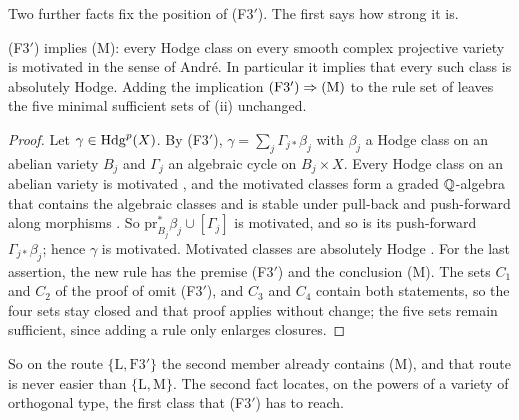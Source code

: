 Two further facts fix the position of \textup{(F3$'$)}. The first says how
strong it is.

\begin{proposition}\label{prop:f3primestrength}
\textup{(F3$'$)} implies \textup{(M)}: every Hodge class on every smooth
complex projective variety is motivated in the sense of Andr\'e. In
particular it implies that every such class is absolutely Hodge. Adding the
implication $\textup{(F3$'$)}\Rightarrow\textup{(M)}$ to the rule set of
 leaves the five minimal sufficient sets of
(ii) unchanged.
\end{proposition}

\begin{proof}
Let $\gamma\in\mathrm{Hdg}^{p}(X)$. By \textup{(F3$'$)},
$\gamma=\sum_{j}\Gamma_{j*}\beta_{j}$ with $\beta_{j}$ a Hodge class on an
abelian variety $B_{j}$ and $\Gamma_{j}$ an algebraic cycle on $B_{j}\times X$.
Every Hodge class on an abelian variety is motivated
\cite[Th\'eor\`eme~0.6.2]{And96b}, and the motivated classes form a graded
$\mathbb{Q}$-algebra that contains the algebraic classes and is stable under
pull-back and push-forward along morphisms \cite[\S2]{And96b}. So
$\mathrm{pr}_{B_{j}}^{*}\beta_{j}\cup[\Gamma_{j}]$ is motivated, and so is its
push-forward $\Gamma_{j*}\beta_{j}$; hence $\gamma$ is motivated. Motivated
classes are absolutely Hodge \cite[\S2]{And96b}. For the last assertion,
the new rule has the premise (F3$'$) and the conclusion (M). The sets $C_{1}$
and $C_{2}$ of the proof of  omit (F3$'$), and $C_{3}$ and
$C_{4}$ contain both statements, so the four sets stay closed and that proof
applies without change; the five sets remain sufficient, since adding a rule
only enlarges closures.
\end{proof}

So on the route $\{\mathrm{L},\mathrm{F3}'\}$ the second member already
contains \textup{(M)}, and that route is never easier than
$\{\mathrm{L},\mathrm{M}\}$. The second fact locates, on the powers of a variety of orthogonal type,
the first class that \textup{(F3$'$)} has to reach.


